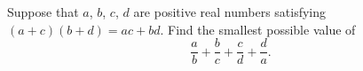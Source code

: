 Suppose that $a$, $b$, $c$, $d$ are positive real numbers satisfying $(a+c)(b+d) = ac + bd$. Find the smallest possible value of
\[
\frac{a}{b} + \frac{b}{c} + \frac{c}{d} + \frac{d}{a}.
\]
